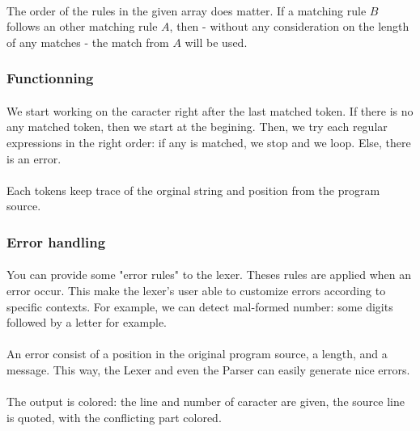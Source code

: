 \documentclass{article}
\begin{document}
				\paragraph{} The order of the rules in the given array does matter. If a matching rule $B$ follows an other matching rule $A$, then - without any consideration on the length of any matches - the match from $A$ will be used.
			\subsubsection{Functionning}
				\paragraph{} We start working on the caracter right after the last matched token. If there is no any matched token, then we start at the begining. Then, we try each regular expressions in the right order: if any is matched, we stop and we loop. Else, there is an error.
				\paragraph{} Each tokens keep trace of the orginal string and position from the program source.
			\subsubsection{Error handling}
				\paragraph{} You can provide some "error rules" to the lexer. Theses rules are applied when an error occur. This make the lexer's user able to customize errors according to specific contexts. For example, we can detect mal-formed number: some digits followed by a letter for example.
				\paragraph{} An error consist of a position in the original program source, a length, and a message. This way, the Lexer and even the Parser can easily generate nice errors.
				\paragraph{} The output is colored: the line and number of caracter are given, the source line is quoted, with the conflicting part colored.
\end{document}
